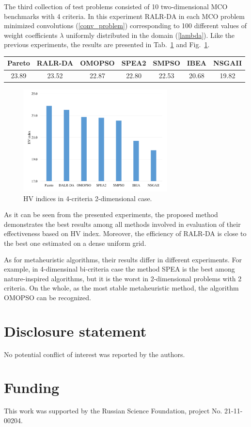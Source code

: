 \documentclass[]{interact}
\theoremstyle{plain}%
\theoremstyle{definition}
\theoremstyle{remark}
\begin{document}
The third collection of test problems consisted of 10 two-dimensional MCO benchmarks with 4 criteria. In this experiment RALR-DA in each MCO problem minimized convolutions (\ref{conv_problem}) corresponding to 100 different values of weight coefficients $\lambda$ uniformly distributed in the domain (\ref{lambda}).
Like  the  previous experiments, the results are presented in Tab.~\ref{tab3} and Fig.~\ref{fig5}.

\begin{table}
{\begin{tabular}{ccccccc} \toprule
 Pareto & RALR-DA & OMOPSO & SPEA2 & SMPSO & IBEA & NSGAII   \\ \midrule
  23.89 & 23.52 & 22.87 & 22.80 & 22.53 & 20.68 & 19.82 \\ \bottomrule
\end{tabular}}
\label{tab3}
\end{table}

\begin{figure}
\centering
\includegraphics[width=0.7\textwidth]{fig5.pdf} 
\caption{HV indices in 4-criteria 2-dimensional case.}\label{fig5} 
\end{figure}

As it can be seen from the presented experiments, the proposed method demonstrates the best results among all methods involved in evaluation of their effectiveness based on HV index. Moreover, the efficiency of RALR-DA is close to the best one estimated on a dense uniform grid.

As for metaheuristic algorithms, their results differ in different experiments.  For example, in 4-dimensinal bi-criteria case the method SPEA is the best among nature-inspired algorithms, but it is the worst in 2-dimensional problems with 2 criteria. On the whole, as the most stable metaheuristic method, the algorithm OMOPSO can be recognized.


\section*{Disclosure statement}

No potential conflict of interest was reported by the authors.

\section*{Funding}

This work was supported by the Russian Science Foundation, project No. 21-11-00204.





\end{document}
